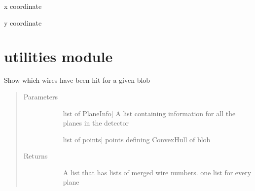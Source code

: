 \documentclass[letterpaper,10pt,english]{sphinxmanual}
\begin{document}
\begin{fulllineitems}
\begin{fulllineitems}
\label{\detokenize{dataTypes:dataTypes.Point.x}}
x coordinate

\end{fulllineitems}


\begin{fulllineitems}
\label{\detokenize{dataTypes:dataTypes.Point.y}}
y coordinate

\end{fulllineitems}


\end{fulllineitems}



\section{utilities module}
\label{\detokenize{utilities:module-utilities}}\label{\detokenize{utilities:utilities-module}}\label{\detokenize{utilities::doc}}

\begin{fulllineitems}
\label{\detokenize{utilities:utilities.fireWires}}
Show which wires have been hit for a given blob
\begin{quote}\begin{description}
\item[{Parameters}] \leavevmode\begin{description}
\item[{}] \leavevmode{[}list of PlaneInfo{]}
A list containing information for all the planes in the detector

\item[{}] \leavevmode{[}list of points{]}
points defining ConvexHull of blob

\end{description}

\item[{Returns}] \leavevmode\begin{description}
\item[{}] \leavevmode
A list that has lists of merged wire numbers. one list for every plane

\end{description}

\end{description}\end{quote}

\end{fulllineitems}
\end{document}
